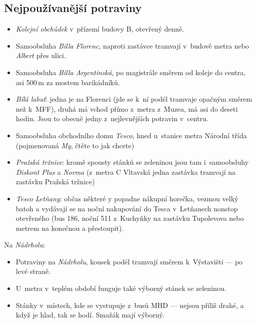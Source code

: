 \subsection{Nejpoužívanější potraviny}
\begin{itemize}

\item {\it Kolejní obchůdek} v~přízemí budovy B, otevřený denně.

\item Samoobsluha {\it Billa Florenc}, naproti zastávce tramvají
v~budově metra nebo {\it Albert} přes ulici.

\item Samoobsluha {\it Billa Argentinská}, po magistrále směrem od
koleje do centra, asi 500$\,$m za mostem barikádníků.


\item {\it Bílá labuť\/}: jedna je na Florenci (jde se k~ní podél
tramvaje opačným směrem než k~MFF), druhá má vchod přímo z~metra
z~Muzea, má asi do deseti hodin.  Jsou to obecně jedny
z~nejlevnějších potravin v~centru.

\item Samoobsluha obchodního domu {\it Tesco}, hned u~stanice
metra Národní třída (pojmenovaná {\it My}, čtěte to jak chcete)


\item {\it Pražská tržnice\/}: kromě spousty stánků se zeleninou jsou tam
i~samoobsluhy {\it Diskont Plus\/} a {\it Norma\/} (z~metra C Vltavská
jedna zastávka tramvají na zastávku Pražská tržnice)

\item {\it Tesco Letňany\/}: občas některé \mfk{}y popadne
nákupní horečka, vezmou velký batoh a vydávají se na noční
nakupování do Tesca v~Letňanech nonstop otevřeného (bus 186, noční
511 z~Kuchyňky na zastávku Tupolevova nebo metrem na konečnou a
přestoupit).


\end{itemize} 


Na {\it Nádrholu}:
\begin{itemize}
\item Potraviny na {\it Nádrholu}, kousek podél tramvají směrem
k~Výstavišti --- po levé straně. 

\item U~metra v~teplém období funguje také
výborný stánek se zeleninou.

\item Stánky v~místech, kde se vystupuje z~busů MHD --- 
nejsou příliš drahé, a když je hlad, tak se hodí. Smažák mají
výborný.


\end{itemize}
